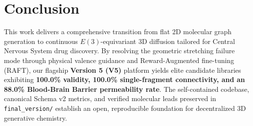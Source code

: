 \documentclass[11pt, a4paper]{article}
\begin{document}
\section{Conclusion}
This work delivers a comprehensive transition from flat 2D molecular graph generation to continuous $E(3)$-equivariant 3D diffusion tailored for Central Nervous System drug discovery. By resolving the geometric stretching failure mode through physical valence guidance and Reward-Augmented fine-tuning (RAFT), our flagship \textbf{Version 5 (V5)} platform yields elite candidate libraries exhibiting \textbf{100.0\% validity, 100.0\% single-fragment connectivity, and an 88.0\% Blood-Brain Barrier permeability rate}. The self-contained codebase, canonical Schema v2 metrics, and verified molecular leads preserved in \texttt{final\_version/} establish an open, reproducible foundation for decentralized 3D generative chemistry.
\end{document}
